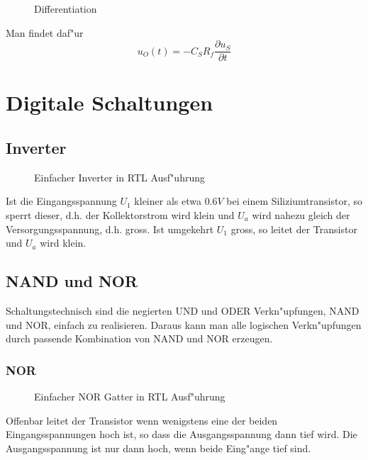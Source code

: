 \documentclass[german, 10pt, a4paper, headsepline]{scrreprt}
\theoremstyle{remark}
\begin{document}
\begin{figure}[hbt]
 
 \centerline{\box\graph}
 \caption{Differentiation}
 \label{opamp_diff}
\end{figure}

Man findet daf"ur
\begin{displaymath}
	u_O(t) = -C_S R_f \frac{\partial u_S}{\partial t}
\end{displaymath}

\section{Digitale Schaltungen}

\subsection{Inverter}

\begin{figure}[hbt]
 
 \centerline{\box\graph}
 \caption{Einfacher Inverter in RTL Ausf"uhrung}
 \label{digi_inverter}
\end{figure}

Ist die Eingangsspannung $U_1$ kleiner als etwa $0.6V$ bei einem Siliziumtransistor, so sperrt dieser, d.h. der Kollektorstrom wird klein und $U_a$ wird nahezu gleich der Versorgungsspannung, d.h. gross. Ist umgekehrt $U_1$ gross, so leitet der Transistor und $U_a$ wird klein.

\pagebreak

\subsection{NAND und NOR}

Schaltungstechnisch sind die negierten UND und ODER Verkn"upfungen, NAND und NOR, einfach zu realisieren. Daraus kann man alle logischen Verkn"upfungen durch passende Kombination von NAND und NOR erzeugen. 

\subsubsection{NOR}
\begin{figure}[hbt]
 
 \centerline{\box\graph}
 \caption{Einfacher NOR Gatter in RTL Ausf"uhrung}
 \label{digi_nor}
\end{figure}

Offenbar leitet der Transistor wenn wenigstens eine der beiden Eingangsspannungen hoch ist, so dass die Ausgangsspannung dann tief wird. Die Ausgangsspannung ist nur dann hoch, wenn beide Eing"ange tief sind.
\end{document}
